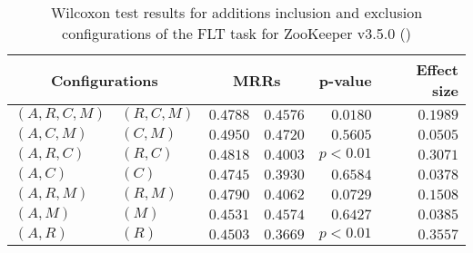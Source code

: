 
\begin{table}
\begin{spacing}{1.2}
\centering
\caption{Wilcoxon test results for additions inclusion and exclusion configurations of the FLT task for ZooKeeper v3.5.0 (\ctwo)}
\label{table:versus-wilcox-zookeeper-flt-additions}
\begin{tabular}{ll|rr|rr}
\toprule
      \multicolumn{2}{c|}{Configurations} &                \multicolumn{2}{c|}{MRRs} &             p-value & Effect size \\
\midrule
 $(A,R,C,M)$ &  $(R,C,M)$ &  $\bm{0.4788}$ &       $0.4576$ & $0.0180$ &    $0.1989$ \\
   $(A,C,M)$ &    $(C,M)$ &  $\bm{0.4950}$ &       $0.4720$ & $0.5605$ &    $0.0505$ \\
   $(A,R,C)$ &    $(R,C)$ &  $\bm{0.4818}$ &       $0.4003$ & $p<0.01$ &    $0.3071$ \\
     $(A,C)$ &      $(C)$ &  $\bm{0.4745}$ &       $0.3930$ & $0.6584$ &    $0.0378$ \\
   $(A,R,M)$ &    $(R,M)$ &  $\bm{0.4790}$ &       $0.4062$ & $0.0729$ &    $0.1508$ \\
     $(A,M)$ &      $(M)$ &       $0.4531$ &  $\bm{0.4574}$ & $0.6427$ &    $0.0385$ \\
     $(A,R)$ &      $(R)$ &  $\bm{0.4503}$ &       $0.3669$ & $p<0.01$ &    $0.3557$ \\
\bottomrule
\end{tabular}

\end{spacing}
\end{table}

